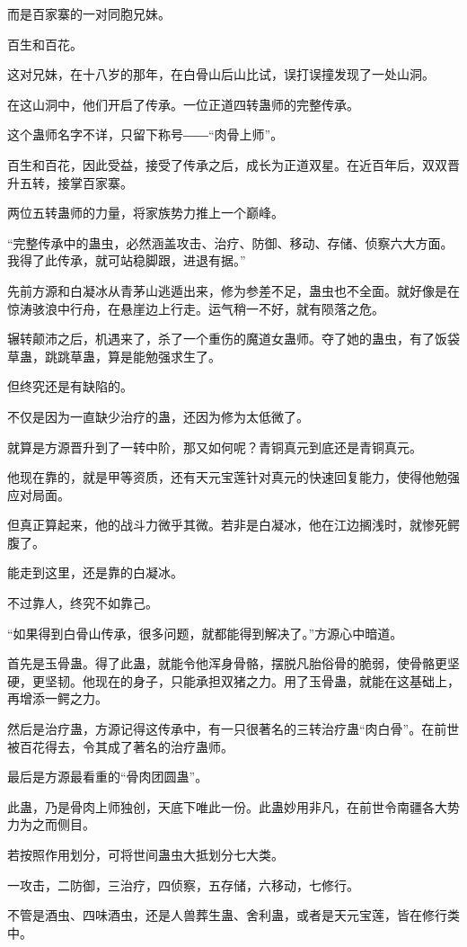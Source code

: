\begin{this_body}
而是百家寨的一对同胞兄妹。

百生和百花。

这对兄妹，在十八岁的那年，在白骨山后山比试，误打误撞发现了一处山洞。

在这山洞中，他们开启了传承。一位正道四转蛊师的完整传承。

这个蛊师名字不详，只留下称号――“肉骨上师”。

百生和百花，因此受益，接受了传承之后，成长为正道双星。在近百年后，双双晋升五转，接掌百家寨。

两位五转蛊师的力量，将家族势力推上一个巅峰。

“完整传承中的蛊虫，必然涵盖攻击、治疗、防御、移动、存储、侦察六大方面。我得了此传承，就可站稳脚跟，进退有据。”

先前方源和白凝冰从青茅山逃遁出来，修为参差不足，蛊虫也不全面。就好像是在惊涛骇浪中行舟，在悬崖边上行走。运气稍一不好，就有陨落之危。

辗转颠沛之后，机遇来了，杀了一个重伤的魔道女蛊师。夺了她的蛊虫，有了饭袋草蛊，跳跳草蛊，算是能勉强求生了。

但终究还是有缺陷的。

不仅是因为一直缺少治疗的蛊，还因为修为太低微了。

就算是方源晋升到了一转中阶，那又如何呢？青铜真元到底还是青铜真元。

他现在靠的，就是甲等资质，还有天元宝莲针对真元的快速回复能力，使得他勉强应对局面。

但真正算起来，他的战斗力微乎其微。若非是白凝冰，他在江边搁浅时，就惨死鳄腹了。

能走到这里，还是靠的白凝冰。

不过靠人，终究不如靠己。

“如果得到白骨山传承，很多问题，就都能得到解决了。”方源心中暗道。

首先是玉骨蛊。得了此蛊，就能令他浑身骨骼，摆脱凡胎俗骨的脆弱，使骨骼更坚硬，更坚韧。他现在的身子，只能承担双猪之力。用了玉骨蛊，就能在这基础上，再增添一鳄之力。

然后是治疗蛊，方源记得这传承中，有一只很著名的三转治疗蛊“肉白骨”。在前世被百花得去，令其成了著名的治疗蛊师。

最后是方源最看重的“骨肉团圆蛊”。

此蛊，乃是骨肉上师独创，天底下唯此一份。此蛊妙用非凡，在前世令南疆各大势力为之而侧目。

若按照作用划分，可将世间蛊虫大抵划分七大类。

一攻击，二防御，三治疗，四侦察，五存储，六移动，七修行。

不管是酒虫、四味酒虫，还是人兽葬生蛊、舍利蛊，或者是天元宝莲，皆在修行类中。


\end{this_body}

